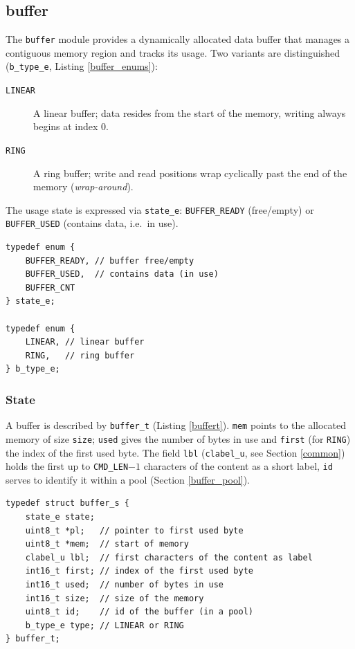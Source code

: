 \subsection{buffer}\label{buffer}
The \verb|buffer| module provides a dynamically allocated data buffer that
manages a contiguous memory region and tracks its usage. Two variants are
distinguished (\verb|b_type_e|, Listing \ref{buffer_enums}):
\begin{description}
\item[\texttt{LINEAR}] A linear buffer; data resides from the start of the
  memory, writing always begins at index $0$.
\item[\texttt{RING}] A ring buffer; write and read positions wrap cyclically
  past the end of the memory (\emph{wrap-around}).
\end{description}
The usage state is expressed via \verb|state_e|: \verb|BUFFER_READY|
(free/empty) or \verb|BUFFER_USED| (contains data, i.e.\ in use).

\begin{listing}
\begin{verbatim}
typedef enum {
    BUFFER_READY, // buffer free/empty
    BUFFER_USED,  // contains data (in use)
    BUFFER_CNT
} state_e;

typedef enum {
    LINEAR, // linear buffer
    RING,   // ring buffer
} b_type_e;
\end{verbatim}
\caption{Enumerations \texttt{state\_e} and \texttt{b\_type\_e}}
\label{buffer_enums}
\end{listing}

\subsubsection*{State}
A buffer is described by \verb|buffer_t| (Listing \ref{buffert}). \verb|mem|
points to the allocated memory of size \verb|size|; \verb|used| gives the
number of bytes in use and \verb|first| (for \verb|RING|) the index of the
first used byte. The field \verb|lbl| (\verb|clabel_u|, see Section
\ref{common}) holds the first up to \verb|CMD_LEN|$-1$ characters of the
content as a short label, \verb|id| serves to identify it within a pool
(Section \ref{buffer_pool}).

\begin{listing}
\begin{verbatim}
typedef struct buffer_s {
    state_e state;
    uint8_t *pl;   // pointer to first used byte
    uint8_t *mem;  // start of memory
    clabel_u lbl;  // first characters of the content as label
    int16_t first; // index of the first used byte
    int16_t used;  // number of bytes in use
    int16_t size;  // size of the memory
    uint8_t id;    // id of the buffer (in a pool)
    b_type_e type; // LINEAR or RING
} buffer_t;
\end{verbatim}
\caption{Definition of the \texttt{buffer\_t} structure}
\label{buffert}
\end{listing}


